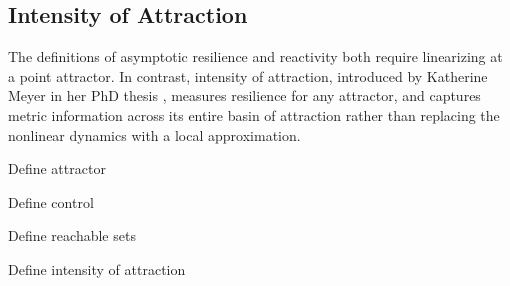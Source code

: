\subsection{Intensity of Attraction}

The definitions of asymptotic resilience and reactivity both require linearizing at a point attractor. In contrast, intensity of attraction, introduced by Katherine Meyer in her PhD thesis \cite{meyerMetricPropertiesAttractors2019}, measures resilience for any attractor, and captures metric information across its entire basin of attraction rather than replacing the nonlinear dynamics with a local approximation. 

Define attractor

Define control

Define reachable sets

Define intensity of attraction